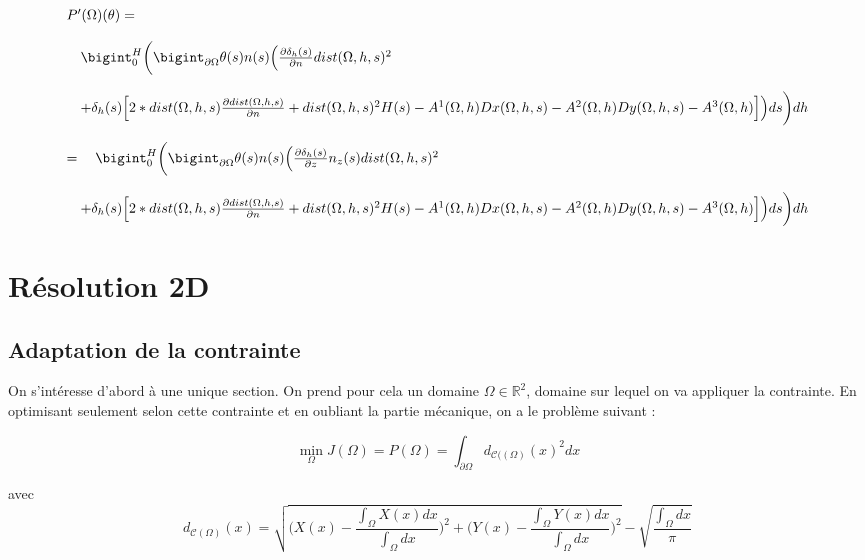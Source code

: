 \documentclass[11pt,a4paper]{article}
\begin{document}
\begin{equation}
\begin{array}{l}
P'(\Omega)(\theta)= \\
\\
\quad \bigint_0^H\bigg(\bigint_{\partial\Omega}
\theta(s)n(s)\Big(\frac{\partial\delta_h(s)}{\partial n}dist(\Omega,h,s)^2\\
\\
\quad +\delta_h(s)\Big[2*dist(\Omega,h,s)\frac{\partial dist(\Omega,h,s)}{\partial n}+dist(\Omega,h,s)^2H(s)-A^1(\Omega,h)Dx(\Omega,h,s)-A^2(\Omega,h)Dy(\Omega,h,s)-A^3(\Omega,h)\Big]\Big) ds\bigg)dh\\
\\
=\quad \bigint_0^H\bigg(\bigint_{\partial\Omega}
\theta(s)n(s)\Big(\frac{\partial\delta_h(s)}{\partial z}n_z(s)dist(\Omega,h,s)^2\\
\\
\quad +\delta_h(s)\Big[2*dist(\Omega,h,s)\frac{\partial dist(\Omega,h,s)}{\partial n}+dist(\Omega,h,s)^2H(s)-A^1(\Omega,h)Dx(\Omega,h,s)-A^2(\Omega,h)Dy(\Omega,h,s)-A^3(\Omega,h)\Big]\Big) ds\bigg)dh\\
\end{array}
\end{equation}



\section*{Résolution 2D}

\subsection*{Adaptation de la contrainte}
On s'intéresse d'abord à une unique section. On prend pour cela un domaine $\Omega\in\mathbb{R}^2$, domaine sur lequel on va appliquer la contrainte. En optimisant seulement selon cette contrainte et en oubliant la partie mécanique, on a le problème suivant :


\begin{equation}
\label{eq:objF2D}
\min_{\Omega}J(\Omega)=P(\Omega)= \int_{\partial\Omega}d_{\mathcal{C}((\Omega)}(x)^2dx
\end{equation}


avec 
\begin{equation}
\label{eq:explicitdist2D}
d_{\mathcal{C}(\Omega)}(x)=\sqrt{\Bigg(X(x)-\frac{\int_{\Omega}X(x)dx}{\int_{\Omega}dx}\Bigg)^2+\Bigg(Y(x)-\frac{\int_{\Omega}Y(x)dx}{\int_{\Omega}dx}\Bigg)^2}-\sqrt{\frac{\int_{\Omega}dx}{\pi}}
\end{equation}
\end{document}
